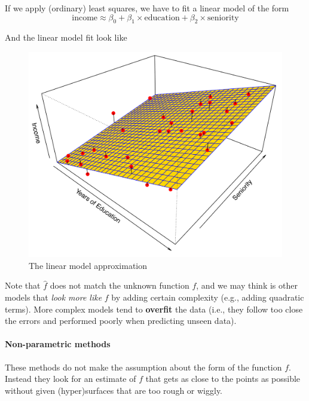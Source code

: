 \documentclass[11pt]{article}
\makeatletter
\def\maxwidth{\ifdim\Gin@nat@width>\linewidth\linewidth
    \else\Gin@nat@width\fi}
\let\Oldincludegraphics\includegraphics
\renewcommand{\includegraphics}[1]{\Oldincludegraphics[width=.8\maxwidth]{#1}}
\makeatother
\begin{document}
    If we apply (ordinary) least squares, we have to fit a linear model of
the form \begin{equation*}
\mathrm{income} \approx \beta_0 + \beta_1 \times\mathrm{education} + \beta_2 \times \mathrm{seniority}  
\end{equation*}

And the linear model fit look like

\begin{figure}[h!]
    \centering
    \includegraphics{2.4.png}
    \caption{The linear model approximation }
\end{figure}

Note that \(\hat{f}\) does not match the unknown function \(f\), and we
may think is other models that \emph{look more like} \(f\) by adding
certain complexity (e.g., adding quadratic terms). More complex models
tend to \textbf{overfit} the data (i.e., they follow too close the
errors and performed poorly when predicting unseen data).

    \hypertarget{non-parametric-methods}{%
\paragraph{Non-parametric methods}\label{non-parametric-methods}}

These methods do not make the assumption about the form of the function
\(f\). Instead they look for an estimate of \(f\) that gets as close to
the points as possible without given (hyper)surfaces that are too rough
or wiggly.
\end{document}
